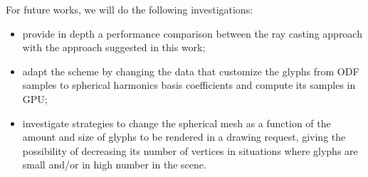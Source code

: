 \documentclass[twoside,twocolumn,10pt]{article}
\begin{document}
For future works, we will do the following investigations:
\begin{itemize}
\item provide in depth a performance comparison between the ray casting approach with the approach suggested in this work;
\item adapt the scheme by changing the data that customize the glyphs from ODF samples to spherical harmonics basis coefficients and compute its samples in GPU;
\item investigate strategies to change the spherical mesh as a function of the amount and size of glyphs to be rendered in a drawing request, giving the possibility of decreasing its number of vertices in situations where glyphs are small and/or in high number in the scene.
\end{itemize}









\end{document}
